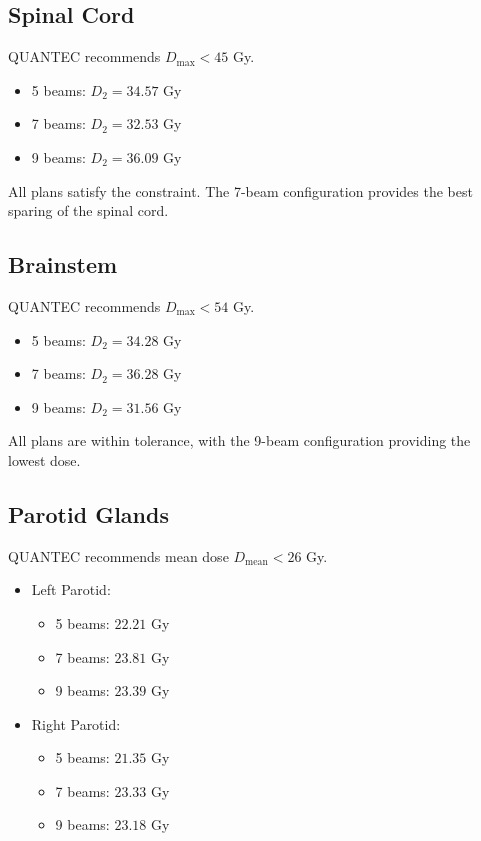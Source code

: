 \subsection*{Spinal Cord}
QUANTEC recommends $D_{\max} < 45$ Gy.

\begin{itemize}
    \item 5 beams: $D_{2} = 34.57$ Gy
    \item 7 beams: $D_{2} = 32.53$ Gy
    \item 9 beams: $D_{2} = 36.09$ Gy
\end{itemize}

All plans satisfy the constraint. The 7-beam configuration provides the best sparing of the spinal cord.

\subsection*{Brainstem}
QUANTEC recommends $D_{\max} < 54$ Gy.

\begin{itemize}
    \item 5 beams: $D_{2} = 34.28$ Gy
    \item 7 beams: $D_{2} = 36.28$ Gy
    \item 9 beams: $D_{2} = 31.56$ Gy
\end{itemize}

All plans are within tolerance, with the 9-beam configuration providing the lowest dose.

\subsection*{Parotid Glands}
QUANTEC recommends mean dose $D_{\text{mean}} < 26$ Gy.

\begin{itemize}
    \item Left Parotid:
    \begin{itemize}
        \item 5 beams: $22.21$ Gy
        \item 7 beams: $23.81$ Gy
        \item 9 beams: $23.39$ Gy
    \end{itemize}
    \item Right Parotid:
    \begin{itemize}
        \item 5 beams: $21.35$ Gy
        \item 7 beams: $23.33$ Gy
        \item 9 beams: $23.18$ Gy
    \end{itemize}
\end{itemize}

